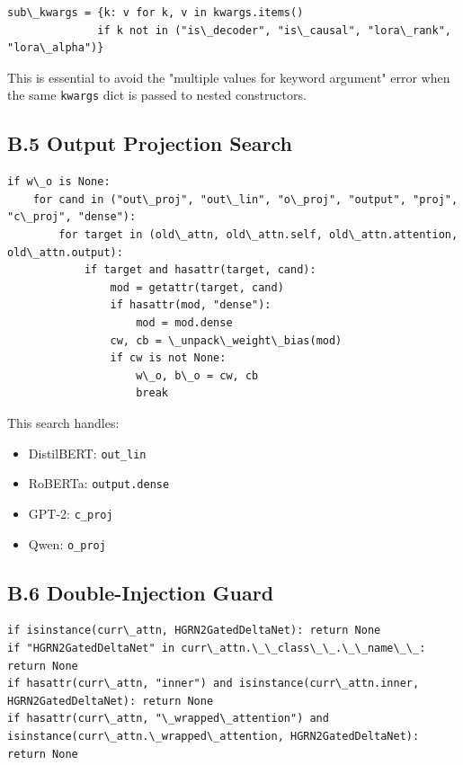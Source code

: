 \begin{lstlisting}
sub\_kwargs = {k: v for k, v in kwargs.items() 
              if k not in ("is\_decoder", "is\_causal", "lora\_rank", "lora\_alpha")}
\end{lstlisting}

This is essential to avoid the "multiple values for keyword argument" error 
when the same \texttt{kwargs} dict is passed to nested constructors.

\subsection{B.5 Output Projection Search}

\begin{lstlisting}
if w\_o is None:
    for cand in ("out\_proj", "out\_lin", "o\_proj", "output", "proj", "c\_proj", "dense"):
        for target in (old\_attn, old\_attn.self, old\_attn.attention, old\_attn.output):
            if target and hasattr(target, cand):
                mod = getattr(target, cand)
                if hasattr(mod, "dense"):
                    mod = mod.dense
                cw, cb = \_unpack\_weight\_bias(mod)
                if cw is not None:
                    w\_o, b\_o = cw, cb
                    break
\end{lstlisting}

This search handles:
\begin{itemize}
\item DistilBERT: \texttt{out\_lin}
\item RoBERTa: \texttt{output.dense}
\item GPT-2: \texttt{c\_proj}
\item Qwen: \texttt{o\_proj}

\end{itemize}
\subsection{B.6 Double-Injection Guard}

\begin{lstlisting}
if isinstance(curr\_attn, HGRN2GatedDeltaNet): return None
if "HGRN2GatedDeltaNet" in curr\_attn.\_\_class\_\_.\_\_name\_\_: return None
if hasattr(curr\_attn, "inner") and isinstance(curr\_attn.inner, HGRN2GatedDeltaNet): return None
if hasattr(curr\_attn, "\_wrapped\_attention") and isinstance(curr\_attn.\_wrapped\_attention, HGRN2GatedDeltaNet): return None
\end{lstlisting}

